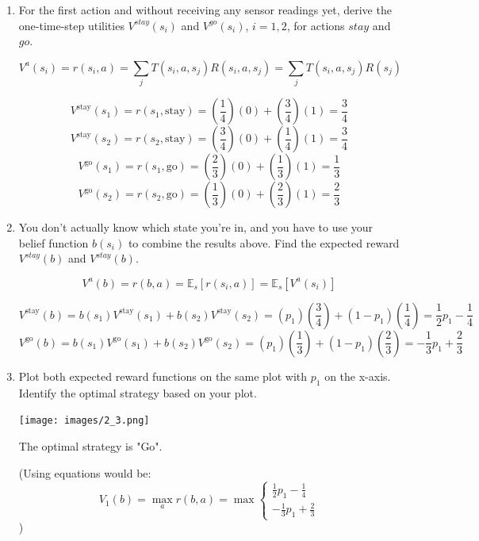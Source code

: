 \documentclass[12pt]{article}
\begin{document}
\begin{enumerate}

\item For the first action and without receiving any sensor readings
  yet, derive the one-time-step utilities $V^{stay}(s_i)$ and
  $V^{go}(s_i)$, $i=1,2$, for actions $stay$ and $go$.

  \[
    V^a(s_i) = r(s_i, a) = \sum_j{T(s_i, a, s_j) R(s_i, a, s_j)} = \sum_j{T(s_i, a, s_j) R(s_j)}
  \]

  \[
    V^{\text{stay}}(s_1) = r(s_1, \text{stay}) = (\frac{1}{4})(0) + (\frac{3}{4})(1) = \frac{3}{4}
  \]
  \[
    V^{\text{stay}}(s_2) = r(s_2, \text{stay}) = (\frac{3}{4})(0) + (\frac{1}{4})(1) = \frac{3}{4}
  \]
  \[
    V^{\text{go}}(s_1) = r(s_1, \text{go}) = (\frac{2}{3})(0) + (\frac{1}{3})(1) = \frac{1}{3}
  \]
  \[
    V^{\text{go}}(s_2) = r(s_2, \text{go}) = (\frac{1}{3})(0) + (\frac{2}{3})(1) = \frac{2}{3}
  \]

\item You don't actually know which state you're in, and you have to
  use your belief function $b(s_i)$ to combine the results above.
  Find the expected reward $V^{stay}(b)$ and $V^{stay}(b)$.

  \[
    V^a(b) = r(b, a) = \mathbb{E}_s[r(s_i,a)] = \mathbb{E}_s[V^a(s_i)]
  \]

  \[
    V^{\text{stay}}(b) = b(s_1) V^{\text{stay}}(s_1) + b(s_2) V^{\text{stay}}(s_2) = (p_1)(\frac{3}{4}) + (1-p_1)(\frac{1}{4}) = \frac{1}{2} p_1 - \frac{1}{4}
  \]
  \[
    V^{\text{go}}(b) = b(s_1) V^{\text{go}}(s_1) + b(s_2) V^{\text{go}}(s_2) = (p_1)(\frac{1}{3}) + (1-p_1)(\frac{2}{3}) = -\frac{1}{3} p_1 + \frac{2}{3}
  \]

\item Plot both expected reward functions on the same plot with $p_1$
  on the x-axis.  Identify the optimal strategy based on your plot.

  \begin{center}
    \texttt{[image: images/2\_3.png]}
  \end{center}

  The optimal strategy is "Go".

  (Using equations would be:
  \[
    V_1(b) = \max_a{r(b, a)} = \max{
      \begin{cases}
        \frac{1}{2} p_1 - \frac{1}{4} \\
        -\frac{1}{3} p_1 + \frac{2}{3}
      \end{cases}
    }
  \]
  )


\end{enumerate}
\end{document}
